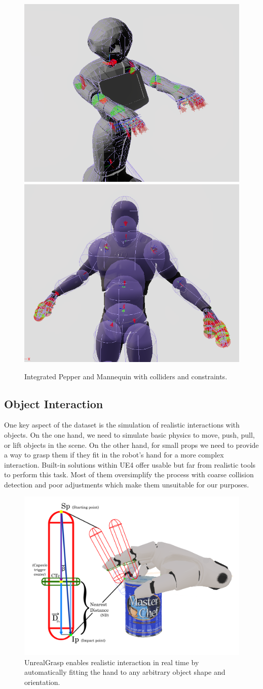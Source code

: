 \begin{figure}[!htb]
  \centering
  \includegraphics[width=0.49\linewidth]{Figures/Sim2Real/pepper_bg.png}
  \includegraphics[width=0.49\linewidth]{Figures/Sim2Real/mannequin_bg.png}
  \caption{Integrated Pepper and Mannequin with colliders and constraints.}
  \label{fig:sim2real:robot_integration}
\end{figure}

\subsection{Object Interaction}

One key aspect of the dataset is the simulation of realistic interactions with objects. On the one hand, we need to simulate basic physics to move, push, pull, or lift objects in the scene. On the other hand, for small props we need to provide a way to grasp them if they fit in the robot's hand for a more complex interaction. Built-in solutions within \ac{UE4} offer usable but far from realistic tools to perform this task. Most of them oversimplify the process with coarse collision detection and poor adjustments which make them unsuitable for our purposes.

\begin{figure}[!htb]
    \centering
    \includegraphics[width=0.6\linewidth]{Figures/Sim2Real/distanceCalculusMod.png}
    \caption{UnrealGrasp enables realistic interaction in real time by automatically fitting the hand to any arbitrary object shape and orientation.}
    \label{fig:sim2real:unrealgrasp}
\end{figure}

